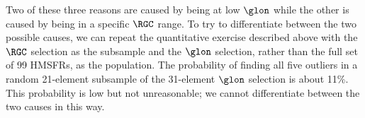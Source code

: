 Two of these three reasons are caused by being at low $\glon$ while the other is caused by being in a specific $\RGC$ range. 
To try to differentiate between the two possible causes, we can repeat the quantitative exercise described above with the $\RGC$ selection as the subsample and the $\glon$ selection, rather than the full set of 99 HMSFRs, as the population. 
The probability of finding all five outliers in a random 21-element subsample of the 31-element $\glon$ selection is about 11\%. 
This probability is low but not unreasonable; we cannot differentiate between the two causes in this way.
